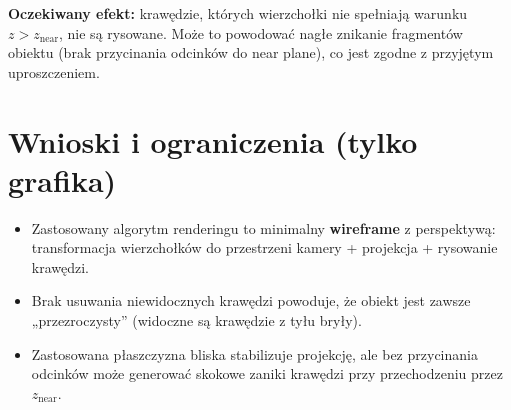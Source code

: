 \documentclass[12pt,a4paper]{article}
\begin{document}
\textbf{Oczekiwany efekt:} krawędzie, których wierzchołki nie spełniają warunku $z>z_{\text{near}}$, nie są rysowane.
Może to powodować nagłe znikanie fragmentów obiektu (brak przycinania odcinków do near plane), co jest zgodne z przyjętym uproszczeniem.

\section{Wnioski i ograniczenia (tylko grafika)}
\begin{itemize}
    \item Zastosowany algorytm renderingu to minimalny \textbf{wireframe} z perspektywą: transformacja wierzchołków do przestrzeni kamery + projekcja + rysowanie krawędzi.
    \item Brak usuwania niewidocznych krawędzi powoduje, że obiekt jest zawsze „przezroczysty” (widoczne są krawędzie z tyłu bryły).
    \item Zastosowana płaszczyzna bliska stabilizuje projekcję, ale bez przycinania odcinków może generować skokowe zaniki krawędzi przy przechodzeniu przez $z_{\text{near}}$.
\end{itemize}
\end{document}

